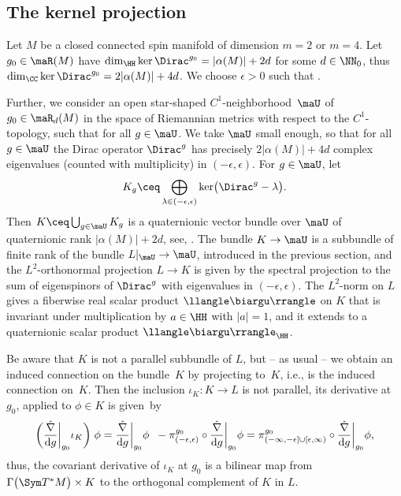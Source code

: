 \subsection{The kernel projection}
Let $M$ be a closed connected spin manifold of dimension $m=2$ or $m=4$.
Let $g_0 \in \maR(M)$ have $\dim_\HH \ker\Dirac^{g_0}= |\alpha(M)|+ 2d$ for some $d\in \NN_0$, thus $\dim_\CC \ker\Dirac^{g_0}= 2|\alpha(M)|+ 4d$.
We choose $\epsilon>0$ such that .

Further, we consider an open star-shaped $C^1$-neighborhood~$\maU$ of~$g_0\in \maR_d(M)$ in the space of Riemannian metrics with respect to the $C^1$-topology,
such that  for all $g\in \maU$.
We take $\maU$ small enough, so that for all $g\in \maU$ the Dirac operator $\Dirac^g$ has precisely $2|\alpha(M)|+4d$ complex eigenvalues (counted with multiplicity) in $(-\epsilon,\epsilon)$. For $g\in \maU$, let
\[
K_g\ceq \bigoplus_{\lambda\in(-\epsilon,\epsilon)}\ker \bigl(\Dirac^g-\lambda\bigr) .
\]
Then $K\ceq \bigcup_{g\in \maU}K_g$ is a quaternionic vector bundle over $\maU$ of quaternionic rank $|\alpha(M)|+2d$, see, \eg \cite[Theorem~4.5.2]{nowaczyk:phd}.
The bundle $K \to \maU$ is a subbundle of finite rank of the bundle $L|_{\maU} \to \maU$, introduced in the previous section, and the $L^2$-orthonormal projection $L \to K$ is given by the spectral projection  to the sum of eigenspinors of $\Dirac^g$ with eigenvalues in $(-\epsilon,\epsilon)$.
The $L^2$-norm on $L$ gives a fiberwise real scalar product $\llangle\biargu\rrangle$ on $K$ that is invariant under multiplication by $a\in \HH$ with $|a|=1$, and it extends to a quaternionic scalar product $\llangle\biargu\rrangle_\HH$.


Be aware that $K$ is not a parallel subbundle of $L$, but -- as usual -- we obtain an induced connection on the bundle~$K$ by projecting to~$K$, i.e.,  is the induced connection on~$K$. Then the inclusion $\iota_K\colon K\to L$ is not parallel, its derivative at $g_0$, applied to $\phi\in K$ is given~by
\[\biggl(\frac{\hat\nabla}{{\rm d}g}\bigg|_{g_0}\iota_K\biggr)\; \phi= \frac{\hat\nabla}{{\rm d}g}\bigg|_{g_0}\phi \;\;- \pi_{(-\epsilon,\epsilon)}^{g_0} \circ\frac{\hat\nabla}{{\rm d}g}\bigg|_{g_0}\phi= \pi_{(-\infty,-\epsilon]\cup [\epsilon,\infty)}^{g_0} \circ\frac{\hat\nabla}{{\rm d}g}\bigg|_{g_0} \phi ,\]
thus, the covariant derivative of $\iota_K$ at $g_0$ is a bilinear map from $\Gamma \bigl(\Sym T^*M\bigr) \times K$ to the orthogonal complement of $K$ in $L$.

